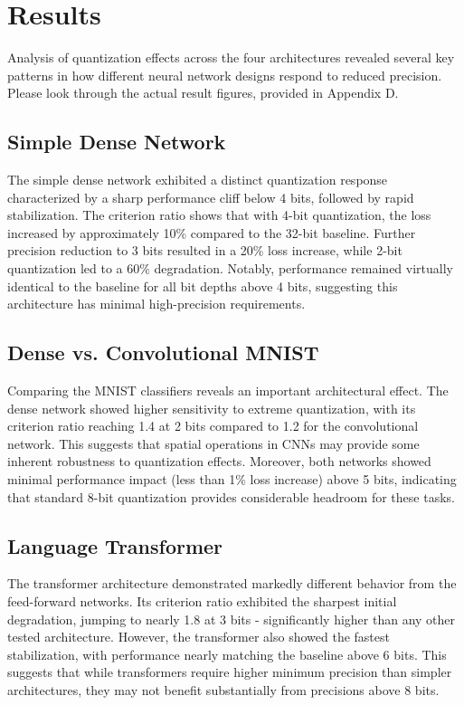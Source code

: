 \documentclass[twocolumn]{article}
\begin{document}
\section{Results}
Analysis of quantization effects across the four architectures revealed several
key patterns in how different neural network designs respond to reduced
precision. Please look through the actual result figures, provided in Appendix D.

\subsection{Simple Dense Network}
The simple dense network exhibited a distinct quantization response
characterized by a sharp performance cliff below 4 bits, followed by rapid
stabilization. The criterion ratio shows that with 4-bit quantization, the loss
increased by approximately 10\% compared to the 32-bit baseline. Further
precision reduction to 3 bits resulted in a 20\% loss increase, while 2-bit
quantization led to a 60\% degradation. Notably, performance remained virtually
identical to the baseline for all bit depths above 4 bits, suggesting this
architecture has minimal high-precision requirements.

\subsection{Dense vs. Convolutional MNIST}
Comparing the MNIST classifiers reveals an important architectural effect. The
dense network showed higher sensitivity to extreme quantization, with its
criterion ratio reaching 1.4 at 2 bits compared to 1.2 for the convolutional
network. This suggests that spatial operations in CNNs may provide some inherent
robustness to quantization effects. Moreover, both networks showed minimal
performance impact (less than 1\% loss increase) above 5 bits, indicating that
standard 8-bit quantization provides considerable headroom for these tasks.

\subsection{Language Transformer}
The transformer architecture demonstrated markedly different behavior from the
feed-forward networks. Its criterion ratio exhibited the sharpest initial
degradation, jumping to nearly 1.8 at 3 bits - significantly higher than any
other tested architecture. However, the transformer also showed the fastest
stabilization, with performance nearly matching the baseline above 6 bits. This
suggests that while transformers require higher minimum precision than simpler
architectures, they may not benefit substantially from precisions above 8 bits.
\end{document}

